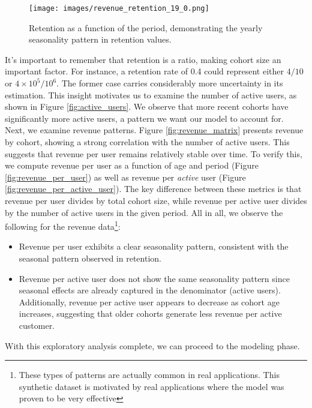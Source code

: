 \documentclass[11pt]{amsart}
\theoremstyle{definition}
\begin{document}
\begin{figure}
    \centering
    \texttt{[image: images/revenue\_retention\_19\_0.png]}
    \caption{Retention as a function of the period, demonstrating the yearly seasonality pattern in retention values.}
    \label{fig:retention_seasonal}
\end{figure}

It's important to remember that retention is a ratio, making cohort size an important factor. For instance, a retention rate
of 0.4 could represent either $4/10$ or $4\times 10^{5} / 10^{6}$. The former case carries considerably more uncertainty in
its estimation. This insight motivates us to examine the number of active users, as shown in Figure \ref{fig:active_users}.
We observe that more recent cohorts have significantly more active users, a pattern we want our model to account for. \\

Next, we examine revenue patterns. Figure \ref{fig:revenue_matrix} presents revenue by cohort, showing a strong correlation with the
number of active users. This suggests that revenue per user remains relatively stable over time. To verify this, we compute
revenue per user as a function of age and period (Figure \ref{fig:revenue_per_user}) as well as revenue per {\em active} user
(Figure \ref{fig:revenue_per_active_user}). The key difference between these metrics is that revenue per user divides by
total cohort size, while revenue per active user divides by the number of active users in the given period. All in all,
we observe the following for the revenue data\footnote{These types of patterns are actually common in real applications. This synthetic
    dataset is motivated by real applications where the model was proven to be very effective}:

\begin{itemize}
    \item Revenue per user exhibits a clear seasonality pattern, consistent with the seasonal pattern observed in retention.
    \item Revenue per active user does not show the same seasonality pattern since seasonal effects are already captured in
          the denominator (active users). Additionally, revenue per active user appears to decrease as cohort age increases,
          suggesting that older cohorts generate less revenue per active customer. \\
\end{itemize}

With this exploratory analysis complete, we can proceed to the modeling phase.
\end{document}
